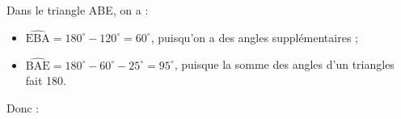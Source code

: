    Dans le triangle ABE, on a : \\
   \begin{itemize}
      \item $\widehat{\text{EBA}} =180^\circ-120^\circ =60^\circ$, puisqu'on a des angles supplémentaires ;
      \item $\widehat{\text{BAE}} =180^\circ-60^\circ-25^\circ =95^\circ$, puisque la somme des angles d'un triangles fait 180\degre.
   \end{itemize}
   Donc :  \\
